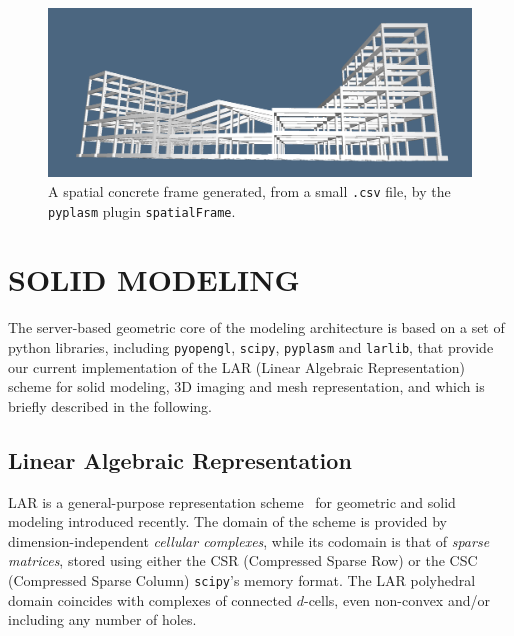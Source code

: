 \documentclass[a4paper,twoside]{article}
\newif\ifreview
\begin{document}
\begin{figure}[t] %
   \centering
   \includegraphics[width=\linewidth]{images/frame}
      \caption{A spatial concrete frame generated, from a small \texttt{.csv} file, by the \texttt{pyplasm} plugin \texttt{spatialFrame}.}
   \label{spatialFrame}
\end{figure}


%
\section{\uppercase{Solid Modeling}}
\label{sec:modeling}

\ifreview

\noindent
The server-based geometric core of the modeling architecture is based on a set of python libraries, including \texttt{pyopengl}, \texttt{scipy}, \texttt{pyplasm} and \texttt{larlib}, that provide the current implementation of the LAR (Linear Algebraic Representation) scheme for solid modeling, 3D imaging and mesh representation, and which is briefly described in the following.

\else

\noindent
The server-based geometric core of the modeling architecture is based on a set of python libraries, including \texttt{pyopengl}, \texttt{scipy}, \texttt{pyplasm} and \texttt{larlib}, that provide our current implementation of the LAR (Linear Algebraic Representation) scheme for solid modeling, 3D imaging and mesh representation, and which is briefly described in the following.

\fi

\subsection{Linear Algebraic Representation}

\noindent
LAR is a general-purpose representation scheme~\cite{Dicarlo:2014:TNL:2543138.2543294} for geometric and solid modeling introduced recently. The domain of the scheme is provided by dimension-independent \emph{cellular complexes}, while its codomain is that of \emph{sparse matrices}, stored using either the CSR (Compressed Sparse Row) or the CSC (Compressed Sparse Column) \texttt{scipy}'s memory format. The LAR polyhedral domain coincides with complexes of connected $d$-cells, even non-convex and/or including any number of holes. 
\end{document}

